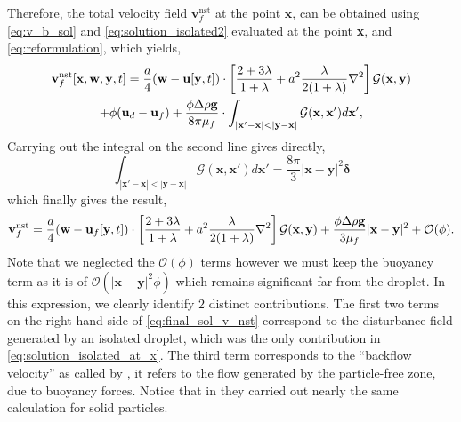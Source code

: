 Therefore, the total velocity field $\textbf{v}^\text{nst}_f$ at the point $\textbf{x}$, can be obtained using \ref{eq:v_b_sol} and \ref{eq:solution_isolated2} evaluated at the point \textbf{x}, and  \ref{eq:reformulation}, which yields,  
\begin{multline}
    \textbf{v}^\text{nst}_f [\textbf{x},\textbf{w},\textbf{y},t]
    =
    \frac{a}{4}(\textbf{w}- \textbf{u}[\textbf{y},t])\cdot\left[
        \frac{2+3\lambda}{1+\lambda}
        +
        a^2\frac{\lambda}{2(1+\lambda)}\mathbf{\nabla}^2 
    \right]\mathcal{G}(\textbf{x},\textbf{y})\\
    +
    \phi(\textbf{u}_d - \textbf{u}_f)
    + 
    \frac{\phi\Delta \rho \textbf{g}}{8\pi \mu_f}\cdot 
    \int_{|\textbf{x}'-\textbf{x}|< |\textbf{y}- \textbf{x}|}
    \mathcal{G}(\textbf{x},\textbf{x}')
    d\textbf{x}',
\end{multline}
Carrying out the integral on the second line gives directly,
\begin{equation}
    \int_{|\textbf{x}'-\textbf{x}|< |\textbf{y}- \textbf{x}|}
    \mathcal{G}(\textbf{x},\textbf{x}')
    d\textbf{x}'
    = \frac{8\pi}{3}|\textbf{x}- \textbf{y}|^2\bm\delta
\end{equation}
which finally gives the result, 
\begin{multline}
    \textbf{v}^\text{nst}_f
    =
    \frac{a}{4}(\textbf{w}- \textbf{u}_f[\textbf{y},t])\cdot\left[
        \frac{2+3\lambda}{1+\lambda}
        +
        a^2\frac{\lambda}{2(1+\lambda)}\grad^2 
    \right]\mathcal{G}(\textbf{x},\textbf{y})
    + 
    \frac{\phi\Delta \rho \textbf{g}}{3\mu_f} |\textbf{x}-\textbf{y}|^2
    +
    \mathcal{O}(\phi).
    \label{eq:final_sol_v_nst}
\end{multline}
Note that we neglected the $\mathcal{O}(\phi)$ terms however we must keep the buoyancy term as it is of $\mathcal{O}(|\textbf{x}-\textbf{y}|^2\phi)$ which remains significant far from the droplet. 
In this expression, we clearly identify $2$ distinct contributions. 
The first two terms on the right-hand side of \ref{eq:final_sol_v_nst} correspond to the disturbance field generated by an isolated droplet, which was the only contribution in \ref{eq:solution_isolated_at_x}. 
The third term corresponds to the ``backflow velocity'' as called by \citet{zhang2021ensemble}, it refers to the flow generated by the particle-free zone, due to buoyancy forces. 
Notice that in \citet[Appendix A]{zhang2021ensemble} they carried out nearly the same calculation for solid particles.
